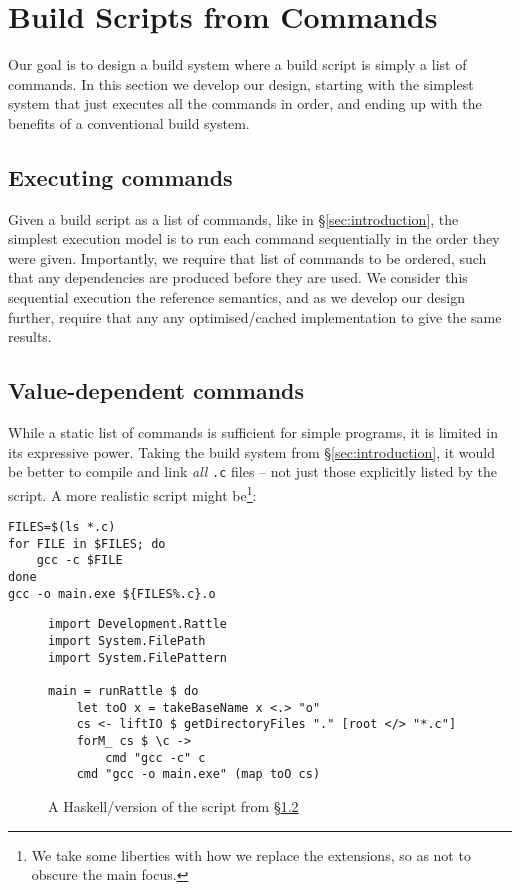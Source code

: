 \section{Build Scripts from Commands}
\label{sec:rattle}

Our goal is to design a build system where a build script is simply a list of commands. In this section we develop our design, starting with the simplest system that just executes all the commands in order, and ending up with the benefits of a conventional build system.

\subsection{Executing commands}
\label{sec:executing_commands}

Given a build script as a list of commands, like in \S\ref{sec:introduction}, the simplest execution model is to run each command sequentially in the order they were given. Importantly, we require that list of commands to be ordered, such that any dependencies are produced before they are used. We consider this sequential execution the reference semantics, and as we develop our design further, require that any any optimised/cached implementation to give the same results.

\subsection{Value-dependent commands}
\label{sec:monadic}

While a static list of commands is sufficient for simple programs, it is limited in its expressive power. Taking the build system from \S\ref{sec:introduction}, it would be better to compile and link \emph{all} \texttt{.c} files -- not just those explicitly listed by the script. A more realistic script might be\footnote{We take some liberties with how we replace the extensions, so as not to obscure the main focus.}:

\vspace{3mm}
\begin{verbatim}
FILES=$(ls *.c)
for FILE in $FILES; do
    gcc -c $FILE
done
gcc -o main.exe ${FILES%.c}.o
\end{verbatim}
\vspace{3mm}

\begin{figure}
\begin{verbatim}
import Development.Rattle
import System.FilePath
import System.FilePattern

main = runRattle $ do
    let toO x = takeBaseName x <.> "o"
    cs <- liftIO $ getDirectoryFiles "." [root </> "*.c"]
    forM_ cs $ \c ->
        cmd "gcc -c" c
    cmd "gcc -o main.exe" (map toO cs)
\end{verbatim}
\caption{A Haskell/\Rattle version of the script from \S\ref{sec:monadic}}
\label{fig:monadic}
\end{figure}

